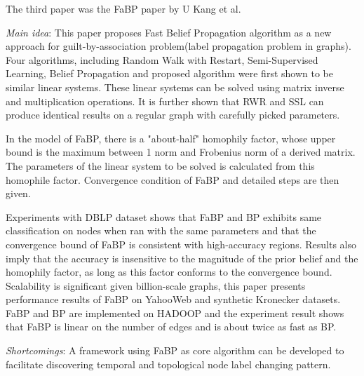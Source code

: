 The third paper was the FaBP paper by U Kang et al.
\cite{DBLP:conf/pkdd/KoutraKKCPF11}
\begin{itemize*}
\item {\em Main idea}: 
This paper proposes Fast Belief Propagation algorithm as a new approach for guilt-by-association problem(label propagation problem in graphs). Four algorithms, including Random Walk with Restart, Semi-Supervised Learning, Belief Propagation and proposed algorithm were first shown to be similar linear systems. These linear systems can be solved using matrix inverse and multiplication operations. It is further shown that RWR and SSL can produce identical results on a regular graph with carefully picked parameters.

In the model of FaBP, there is a "about-half" homophily factor, whose upper bound is the maximum between 1 norm and Frobenius norm of a derived matrix. The parameters of the linear system to be solved is calculated from this homophile factor. Convergence condition of FaBP and detailed steps are then given. 

Experiments with DBLP dataset shows that FaBP and BP exhibits same classification on nodes when ran with the same parameters and that the convergence bound of FaBP is consistent with high-accuracy regions. Results also imply that the accuracy is insensitive to the magnitude of the prior belief and the homophily factor, as long as this factor conforms to the convergence bound. Scalability is significant given billion-scale graphs, this paper presents performance results of FaBP on YahooWeb and synthetic Kronecker datasets. FaBP and BP are implemented on HADOOP and the experiment result shows that FaBP is linear on the number of edges and is about twice as fast as BP.
\item {\em Shortcomings}:
A framework using FaBP as core algorithm can be developed to facilitate discovering temporal and topological node label changing pattern.
\end{itemize*}
